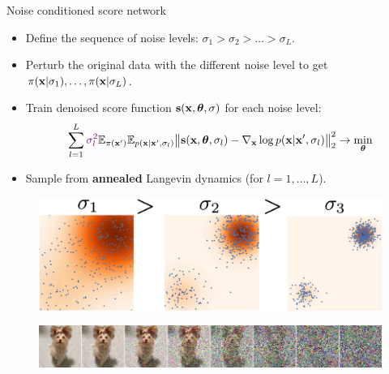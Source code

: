 \begin{frame}{Noise conditioned score network}
	\begin{itemize}
		\item Define the sequence of noise levels: $\sigma_1 > \sigma_2 > \dots > \sigma_L$.
		\item Perturb the original data with the different noise level to get $\pi(\mathbf{x} | \sigma_1), \dots, \pi(\mathbf{x} | \sigma_L)$.
		\item Train denoised score function $\mathbf{s}(\mathbf{x}, \boldsymbol{\theta}, \sigma)$ for each noise level:
		\vspace{-0.2cm}
		\[
			\sum_{l=1}^L {\color{violet}\sigma_l^2} \mathbb{E}_{\pi(\mathbf{x}')} \mathbb{E}_{p(\mathbf{x} | \mathbf{x}', \sigma_l)}\bigl\| \mathbf{s}(\mathbf{x}, \boldsymbol{\theta}, \sigma_l) - \nabla_{\mathbf{x}} \log p(\mathbf{x} | \mathbf{x}', \sigma_l) \bigr\|^2_2 \rightarrow \min_{\boldsymbol{\theta}}
		\]
		\item Sample from \textbf{annealed} Langevin dynamics (for $l=1, \dots, L$).
	\end{itemize}
	\begin{figure}
		\includegraphics[width=0.6\linewidth]{figs/multi_scale}
	\end{figure}
	\begin{figure}
		\includegraphics[width=\linewidth]{figs/duoduo}
	\end{figure}
\end{frame}
